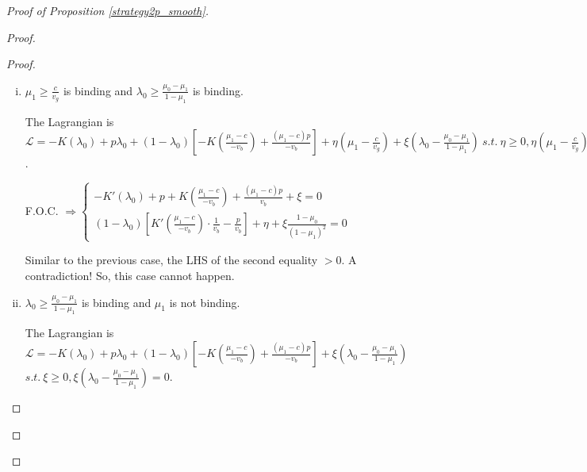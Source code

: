 \documentclass[11pt]{extarticle}
\newcommand{\ra}{\Rightarrow}
\begin{document}
\begin{proof}[Proof of Proposition \ref{strategy2p_smooth}]
\begin{enumerate}
\begin{proof}
\begin{proof}
\begin{enumerate}[i)]
					The Lagrangian is $\mathcal{L} = -K(\lambda_0) + p \lambda_0 + (1-\lambda_0) \left[-K(\frac{\mu_1-c}{-v_b})+\frac{(\mu_1-c)p}{-v_b}\right] + \eta \left(\mu_1- \frac{c}{v_g}\right)$ $s.t.~\eta \geq 0, \eta \left(\mu_1- \frac{c}{v_g}\right) = 0$.
					
					F.O.C. $\ra \begin{cases}
					-K'(\lambda_0) + p +K(\frac{\mu_1-c}{-v_b})+\frac{(\mu_1-c)p}{v_b} = 0 \\
					(1-\lambda_0) \left[K'(\frac{\mu_1-c}{-v_b})\cdot \frac{1}{v_b}-\frac{p}{v_b}\right]+\eta =0
					\end{cases}$
					
					The second equality $\ra \eta = -\frac{1-\lambda_0}{v_b} \left[K'(\frac{\mu_1-c}{-v_b})-p\right] \overset{c<v_g\lambda_{1}^{**}}{<} -\frac{1-\lambda_0}{v_b} \left[K'(\lambda_1^{**})-p\right] = 0$. 
					But $\eta \geq 0$. A contradiction! So, this case cannot happen.
					
					\item $\mu_1\geq \frac{c}{v_g}$ is binding and $\lambda_0 \geq\frac{\mu_0-\mu_1}{1-\mu_1}$ is binding.
					
					The Lagrangian is $\mathcal{L} = -K(\lambda_0) + p \lambda_0 + (1-\lambda_0) \left[-K(\frac{\mu_1-c}{-v_b})+\frac{(\mu_1-c)p}{-v_b}\right] + \eta \left(\mu_1- \frac{c}{v_g}\right)+\xi \left( \lambda_0 - \frac{\mu_0-\mu_1}{1-\mu_1} \right)~s.t.~\eta \geq 0, \eta \left(\mu_1- \frac{c}{v_g}\right) = 0,\xi \geq 0, \xi \left( \lambda_0 - \frac{\mu_0-\mu_1}{1-\mu_1} \right) = 0$.
					
					F.O.C. $\ra \begin{cases}
					-K'(\lambda_0) + p +K(\frac{\mu_1-c}{-v_b})+\frac{(\mu_1-c)p}{v_b}+\xi = 0 \\
					(1-\lambda_0) \left[K'(\frac{\mu_1-c}{-v_b})\cdot \frac{1}{v_b}-\frac{p}{v_b}\right]+\eta+\xi \frac{1-\mu_0}{(1-\mu_1)^2} =0
					\end{cases}$
					
					Similar to the previous case, the LHS of the second equality $> 0$. A contradiction! So, this case cannot happen. 
					
					\item $\lambda_0 \geq\frac{\mu_0-\mu_1}{1-\mu_1}$ is binding and $\mu_1$ is not binding.
					
					The Lagrangian is $\mathcal{L} = -K(\lambda_0) + p \lambda_0 + (1-\lambda_0) \left[-K(\frac{\mu_1-c}{-v_b})+\frac{(\mu_1-c)p}{-v_b}\right] + \xi \left( \lambda_0 - \frac{\mu_0-\mu_1}{1-\mu_1} \right)$ $s.t.~\xi \geq 0, \xi \left( \lambda_0 - \frac{\mu_0-\mu_1}{1-\mu_1} \right) = 0$.
					

\end{enumerate}
\end{proof}
\end{proof}
\end{enumerate}
\end{proof}
\end{document}
